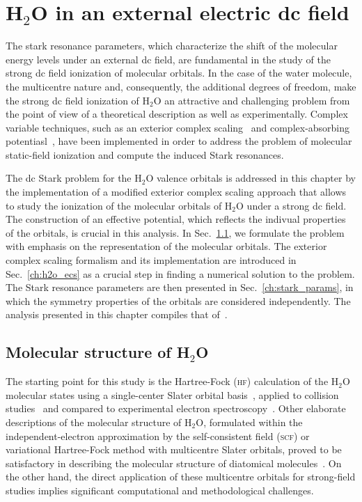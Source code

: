 \chapter{H$_{2}$O in an external electric dc field}
\label{cha:dc_h2o}


The stark resonance parameters, which characterize the shift of the
molecular energy levels under an external dc field, are fundamental in
the study of the strong dc field ionization of molecular orbitals. In
the case of the water molecule, the multicentre nature and,
consequently, the additional degrees of freedom, make the strong dc
field ionization of H$_{2}$O an attractive and challenging problem
from the point of view of a theoretical description as well as
experimentally. Complex variable techniques, such as an exterior
complex scaling~\cite{Simon_1979,Scrinzi_2010} and complex-absorbing
potentiasl~\cite{RissMeyer_1993,Krause_2014}, have been implemented in
order to address the problem of molecular static-field ionization and
compute the induced Stark resonances.

The dc Stark problem for the H$_{2}$O valence orbitals is addressed in
this chapter by the implementation of a modified exterior complex
scaling approach that allows to study the ionization of the molecular
orbitals of H$_{2}$O under a strong dc field. The construction of an
effective potential, which reflects the indivual properties of the
orbitals, is crucial in this analysis. In Sec.~\ref{ch:h2o_structure},
we formulate the problem with emphasis on the representation of the
molecular orbitals. The exterior complex scaling formalism and its
implementation are introduced in Sec.~\ref{ch:h2o_ecs} as a crucial
step in finding a numerical solution to the problem. The Stark
resonance parameters are then presented in Sec.~\ref{ch:stark_params},
in which the symmetry properties of the orbitals are considered
independently. The analysis presented in this chapter compiles that
of~\cite{sarias_2016,sarias_2017}.


\section{Molecular structure of H$_{2}$O}
\label{ch:h2o_structure}

The starting point for this study is the Hartree-Fock (\textsc{hf})
calculation of the H$_{2}$O molecular states using a single-center
Slater orbital
basis~\cite{Moccia_1964,Moccia_JCP_2164,Moccia_JCP_2176}, applied to
collision studies~\cite{Montanari_2013} and compared to experimental
electron spectroscopy~\cite{Hafied_2007}. Other elaborate descriptions
of the molecular structure of H$_{2}$O, formulated within the
independent-electron approximation by the self-consistent field
(\textsc{scf}) or variational Hartree-Fock method with multicentre
Slater orbitals, proved to be satisfactory in describing the molecular
structure of diatomical molecules~\cite{Pitzer_1968}. On the other
hand, the direct application of these multicentre orbitals for
strong-field studies implies significant computational and
methodological challenges.

